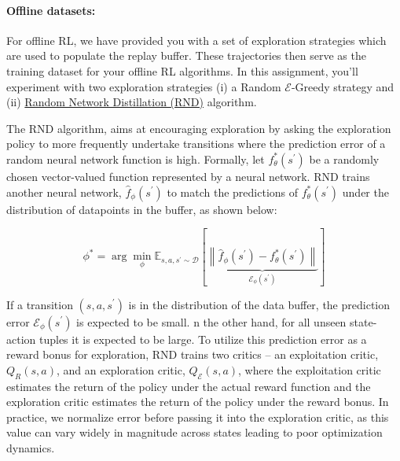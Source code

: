 \documentclass[12pt]{article}
\begin{document}
\paragraph{Offline datasets: } For offline RL, we have provided you with a set of exploration strategies which are used to populate the replay buffer. These trajectories then serve as the training dataset for your offline RL algorithms. In this assignment, you'll experiment with two exploration strategies (i) a Random $\mathcal{E}$-Greedy strategy and (ii) \href{https://arxiv.org/abs/2110.06169}{Random Network Distillation (RND)} algorithm. 

The RND algorithm, aims at encouraging exploration by asking the exploration policy to more frequently undertake transitions where the prediction error of a random neural network function is high. Formally, let $f_\theta^*\left(s^{\prime}\right)$ be a randomly chosen vector-valued function represented by a neural network. RND trains another neural network, $\hat{f}_\phi\left(s^{\prime}\right)$ to match the predictions of $f_\theta^*\left(s^{\prime}\right)$ under the distribution of datapoints in the buffer, as shown below:

\begin{equation}
    \phi^*=\arg \min _\phi \mathbb{E}_{s, a, s^{\prime} \sim \mathcal{D}}[\underbrace{\left\|\hat{f}_\phi\left(s^{\prime}\right)-f_\theta^*\left(s^{\prime}\right)\right\|}_{\mathcal{E}_\phi\left(s^{\prime}\right)}]
\end{equation}

If a transition $(s,a,s^\prime)$ is in the distribution of the data buffer, the prediction error $\mathcal{E}_\phi(s^\prime)$ is expected to be small. n the other hand, for all unseen state-action tuples it is expected to be large. To utilize this prediction error as a reward bonus for exploration, RND trains two critics – an exploitation critic, $Q_R(s,a)$, and an exploration critic, $Q_\mathcal{E} (s, a)$, where the exploitation critic estimates the return of the policy under the actual reward function and the exploration critic estimates the return of the policy under the reward bonus. In practice, we normalize error before passing it into the exploration critic, as this value can vary widely in magnitude across states leading to poor optimization dynamics.


\newpage
\end{document}
